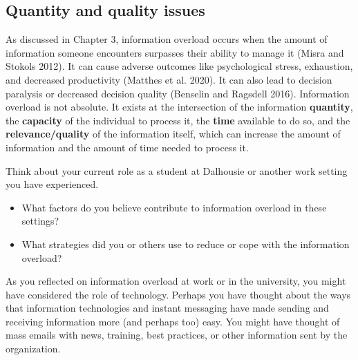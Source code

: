 \documentclass[
  letterpaper,
  DIV=11,
  numbers=noendperiod]{scrreprt}
\begin{document}
\subsection{Quantity and quality
issues}\label{quantity-and-quality-issues}

As discussed in Chapter 3, information overload occurs when the amount
of information someone encounters surpasses their ability to manage it
(Misra and Stokols 2012). It can cause adverse outcomes like
psychological stress, exhaustion, and decreased productivity (Matthes et
al. 2020). It can also lead to decision paralysis or decreased decision
quality (Benselin and Ragsdell 2016). Information overload is not
absolute. It exists at the intersection of the information
\textbf{quantity}, the \textbf{capacity} of the individual to process
it, the \textbf{time} available to do so, and the
\textbf{relevance/quality} of the information itself, which can increase
the amount of information and the amount of time needed to process it.

\begin{tcolorbox}[enhanced jigsaw, arc=.35mm, bottomrule=.15mm, bottomtitle=1mm, breakable, colback=white, colbacktitle=quarto-callout-tip-color!10!white, colframe=quarto-callout-tip-color-frame, coltitle=black, left=2mm, leftrule=.75mm, opacityback=0, opacitybacktitle=0.6, rightrule=.15mm, title=\textcolor{quarto-callout-tip-color}{\faLightbulb}\hspace{0.5em}{Pause and reflect}, titlerule=0mm, toprule=.15mm, toptitle=1mm]

Think about your current role as a student at Dalhousie or another work
setting you have experienced.

\begin{itemize}
\item
  What factors do you believe contribute to information overload in
  these settings?
\item
  What strategies did you or others use to reduce or cope with the
  information overload?
\end{itemize}

\end{tcolorbox}

As you reflected on information overload at work or in the university,
you might have considered the role of technology. Perhaps you have
thought about the ways that information technologies and instant
messaging have made sending and receiving information more (and perhaps
too) easy. You might have thought of mass emails with news, training,
best practices, or other information sent by the organization.
\end{document}
